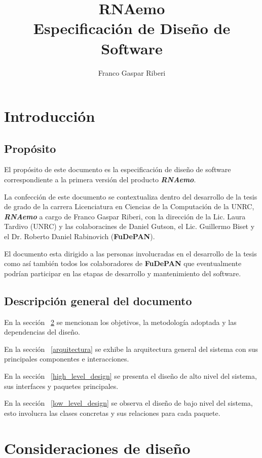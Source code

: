 \documentclass[12pt,a4paper,spanish]{article}
\title{\textbf{RNAemo}\\ \vspace{0.45cm} Especificación de Diseño de Software}
\author{Franco Gaspar Riberi}
\begin{document}
\maketitle\pagebreak{}\tableofcontents{}\pagebreak{}

\newpage

\section{Introducción}
\subsection{Propósito}

El propósito de este documento es la especificación de
diseño de software correspondiente a la primera versión del producto 
\emph{\textbf{RNAemo}}.

La confección de este documento se contextualiza dentro del desarrollo de la tesis
de grado de la carrera Licenciatura en Ciencias de la Computación de la UNRC,
\emph{\textbf{RNAemo}} a cargo de Franco Gaspar Riberi, con la dirección
de la Lic. Laura Tardivo (UNRC) y las colaboracines de Daniel
Gutson, el Lic. Guillermo Biset y el Dr. Roberto Daniel Rabinovich
(\textbf{FuDePAN}).

El documento esta dirigido a las personas involucradas en el desarrollo de la
tesis como así también todos los colaboradores de \textbf{FuDePAN} que eventualmente
podrían participar en las etapas de desarrollo y mantenimiento del software.

\subsection{Descripci\'on general del documento}
En la sección ~\ref{consideraciones} se mencionan los objetivos, la
metodología adoptada y las dependencias del diseño.

En la sección ~\ref{arquitectura} se exhibe la arquitectura general del
sistema con sus principales componentes e interacciones.

En la sección ~\ref{high_level_design} se presenta el diseño de alto nivel del sistema,
sus interfaces y paquetes principales.
				    
En la sección ~\ref{low_level_design} se observa el diseño de bajo nivel del sistema,
esto involucra las clases concretas y sus relaciones para cada paquete.

\section{Consideraciones de diseño}
\label{consideraciones}
\end{document}
